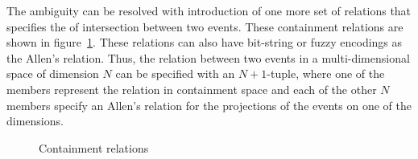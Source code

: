 The ambiguity can be resolved with introduction of one more set of relations that specifies the of intersection
between two events. These containment relations are shown in figure~\ref{fig:clock:containment}. These relations
can also have bit-string or fuzzy encodings as the Allen's relation. Thus, the relation between two events in
a multi-dimensional space of dimension $N$ can be specified with an $N+1$-tuple, where one of the members represent
the relation in containment space and each of the other $N$ members specify an Allen's relation for the  projections
of the events on one of the dimensions.

\begin{figure}[htbp!]
	\centerline{
	}
	\caption{Containment relations}
	\label{fig:clock:containment}
\end{figure}
